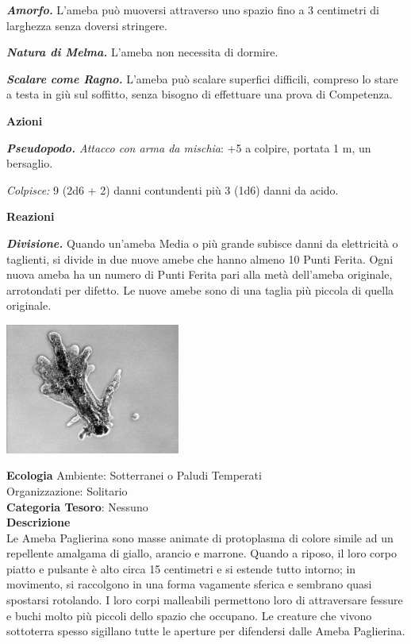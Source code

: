 \begin{multicols}{2}
{\emph{\textbf{Amorfo.}} L'ameba può muoversi attraverso uno spazio fino a 3 centimetri di larghezza senza doversi stringere.

\emph{\textbf{Natura di Melma.}} L'ameba non necessita di dormire.

\emph{\textbf{Scalare come Ragno.}} L'ameba può scalare superfici difficili, compreso lo stare a testa in giù sul soffitto, senza bisogno di effettuare una prova di Competenza.

\textbf{Azioni}

\emph{\textbf{Pseudopodo.} Attacco con arma da mischia}: +5 a colpire, portata 1 m, un bersaglio.

\emph{Colpisce:} 9 (2d6 + 2) danni contundenti più 3 (1d6) danni da acido.

\textbf{Reazioni}

\emph{\textbf{Divisione.}} Quando un'ameba Media o più grande subisce danni da elettricità o taglienti, si divide in due nuove amebe che hanno almeno 10 Punti Ferita. Ogni nuova ameba ha un numero di Punti Ferita pari alla metà dell'ameba originale, arrotondati per difetto. Le nuove amebe sono di una taglia più piccola di quella originale.


\begin{center}
	\includegraphics[width=0.43\textwidth]{immagini/Amoeba_proteus.png}
\end{center}

\textbf{Ecologia}
Ambiente: Sotterranei o Paludi Temperati\\
Organizzazione: Solitario\\
\textbf{Categoria Tesoro}: Nessuno\\
\textbf{Descrizione}\\
Le Ameba Paglierina sono masse animate di protoplasma di colore simile ad un repellente amalgama di giallo, arancio e marrone. Quando a riposo, il loro corpo piatto e pulsante è alto circa 15 centimetri e si estende tutto intorno; in movimento, si raccolgono in una forma vagamente sferica e sembrano quasi spostarsi rotolando. I loro corpi malleabili permettono loro di attraversare fessure e buchi molto più piccoli dello spazio che occupano. Le creature che vivono sottoterra spesso sigillano tutte le aperture per difendersi dalle Ameba Paglierina.

}
\end{multicols}
